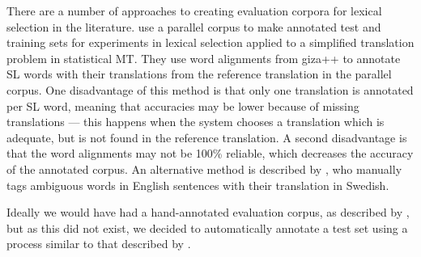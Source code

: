 \documentclass[11pt]{article}
\begin{document}
There are a number of approaches to creating evaluation corpora for
lexical selection in the literature. \cite{vickrey05} use a parallel
corpus to make annotated test and training sets for experiments in
lexical selection applied to a simplified translation problem in
statistical MT. They use word alignments from {\sc giza++}
\citep{och03a} to annotate SL words with their translations from the
reference translation in the parallel corpus. One disadvantage of this
method is that only one translation is annotated per SL word, meaning
that accuracies may be lower because of missing translations --- this
happens when the system chooses a translation which is adequate, but
is not found in the reference translation. A second disadvantage is
that the word alignments may not be 100\% reliable, which decreases
the accuracy of the annotated corpus. An alternative method is
described by \cite{zinovjeva2000}, who manually tags ambiguous words
in English sentences with their %
translation in Swedish. %


%
Ideally we would have had a hand-annotated evaluation corpus, as
described by \cite{zinovjeva2000}, but as this did not exist, we 
decided to automatically annotate a test set using a process similar to 
that described by \cite{vickrey05}.

\end{document}
